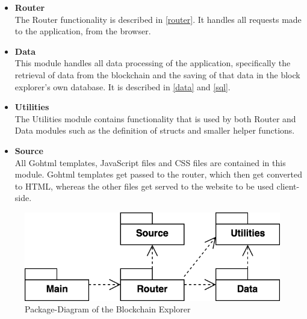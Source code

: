 \begin{itemize}
\item \textbf{Router}\\
The Router functionality is described in \ref{router}. It handles all requests made to the application, from the browser.
\item \textbf{Data}\\
This module handles all data processing of the application, specifically the retrieval of data from the blockchain and the saving of that data in the block explorer's own database. It is described in \ref{data} and \ref{sql}.
\item \textbf{Utilities}\\
The Utilities module contains functionality that is used by both Router and Data modules such as the definition of structs and smaller helper functions.
\item \textbf{Source}\\
All Gohtml templates, JavaScript files and CSS files are contained in this module. Gohtml templates get passed to the router, which then get converted to HTML, whereas the other files get served to the website to be used client-side.
\end{itemize}

\begin{figure}
  \includegraphics[scale=0.35]{packages.png}
  \centering
  \caption{Package-Diagram of the Blockchain Explorer}
  \label{fig:packages}
\end{figure}

